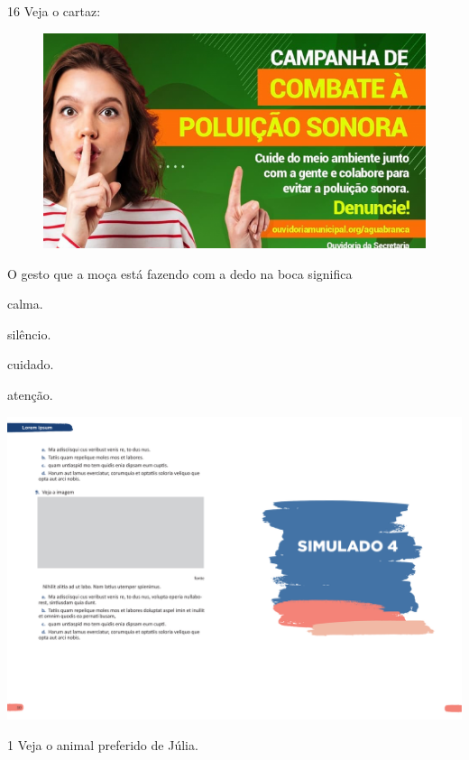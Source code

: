 \num{16} Veja o cartaz:

\begin{figure}[htpb!]
\centering
\includegraphics[width=.5\textwidth]{media/image173.png}
\end{figure}


O gesto que a moça está fazendo com a dedo na boca significa

\begin{escolha}
\item calma.

\item silêncio.

\item cuidado.

\item atenção.
\end{escolha}


\vspace*{-3.4cm}
\hspace*{-3.7cm}\includegraphics[scale=1]{../watermarks/4simulado5ano.pdf}

\num{1} Veja o animal preferido de Júlia.

